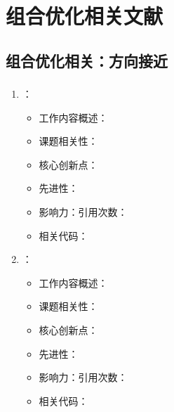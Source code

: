 \chapter{组合优化相关文献}
\section{组合优化相关：方向接近}
\subsection{}
    \begin{enumerate}
        \item \citet{}：
            \begin{itemize}
                \item 工作内容概述：
                \item 课题相关性：
                \item 核心创新点：
                \item 先进性：
                \item 影响力：引用次数：
                \item 相关代码：
            \end{itemize}
        \item \citet{}：
            \begin{itemize}
                \item 工作内容概述：
                \item 课题相关性：
                \item 核心创新点：
                \item 先进性：
                \item 影响力：引用次数：
                \item 相关代码：
            \end{itemize}
    \end{enumerate}

